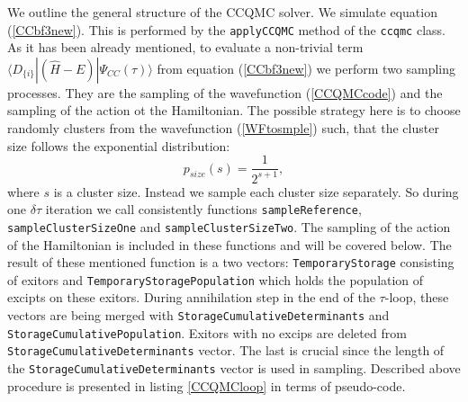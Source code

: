 \documentclass[twoside,english]{uiofysmaster}
\newcommand{\classname}[1]{\texttt{#1}}
\begin{document}
We outline the general structure of the CCQMC solver. 
We simulate equation (\ref{CCbf3new}). This is performed by the \classname{applyCCQMC} method of the \classname{ccqmc} class.
As it has been already mentioned, to evaluate a non-trivial term  $\langle D_{\{i\}}|(\hat{H}-E)|\Psi_{CC}(\tau)\rangle$ from equation (\ref{CCbf3new}) we perform two sampling processes. They are the sampling of the wavefunction (\ref{CCQMCcode}) and the sampling of the action ot the Hamiltonian. The possible strategy here is to choose randomly clusters from the wavefunction (\ref{WFtosmple}) such, that the cluster size follows the exponential distribution:
\begin{equation}\label{expdistrib}
	p_{size}(s)=\frac{1}{2^{s+1}},
\end{equation}
where $s$ is a cluster size.
Instead we sample each cluster size separately. So during one $\delta\tau$ iteration we call consistently functions \classname{sampleReference}, \\ \classname{sampleClusterSizeOne} and \classname{sampleClusterSizeTwo}. The sampling of the action of the Hamiltonian is included in these functions and will be covered below. The result of these mentioned function is a two vectors: \classname{TemporaryStorage} consisting of exitors and \classname{TemporaryStoragePopulation} which holds the population of excipts on these exitors. During annihilation step in the end of the $\tau$-loop, these vectors are being merged with \classname{StorageCumulativeDeterminants} and \classname{StorageCumulativePopulation}. Exitors with no excips are deleted from \classname{StorageCumulativeDeterminants} vector. The last is crucial since the length of the \classname{StorageCumulativeDeterminants} vector is used in sampling. Described above procedure is presented in listing \ref{CCQMCloop} in terms of pseudo-code.
\end{document}
